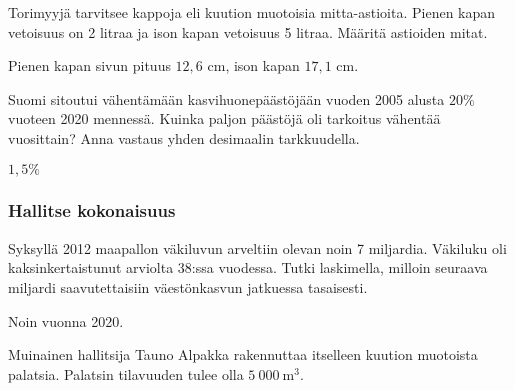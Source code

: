 \begin{tehtavasivu}
\begin{tehtava}%
Torimyyjä tarvitsee kappoja eli kuution muotoisia mitta-astioita. Pienen kapan vetoisuus on 2 litraa ja ison kapan vetoisuus 5 litraa. Määritä astioiden mitat.
\begin{vastaus}
Pienen kapan sivun pituus $12,6$ cm, ison kapan $17,1$ cm. 
\end{vastaus}
\end{tehtava}

\begin{tehtava}%
Suomi sitoutui vähentämään kasvihuonepäästöjään vuoden 2005 alusta $20\%$ vuoteen 2020 mennessä. Kuinka paljon päästöjä oli tarkoitus vähentää vuosittain? Anna vastaus yhden desimaalin tarkkuudella.
\begin{vastaus}
$1,5\%$
\end{vastaus}
\end{tehtava}

\subsubsection*{Hallitse kokonaisuus}
\begin{tehtava}%
Syksyllä 2012 maapallon väkiluvun arveltiin olevan noin 7 miljardia. Väkiluku oli kaksinkertaistunut arviolta 38:ssa vuodessa. Tutki laskimella, milloin seuraava miljardi saavutettaisiin väestönkasvun jatkuessa tasaisesti.
\begin{vastaus}
Noin vuonna 2020.
\end{vastaus}
\end{tehtava}

\begin{tehtava}
Muinainen hallitsija Tauno Alpakka rakennuttaa itselleen kuution muotoista palatsia.  Palatsin tilavuuden tulee olla $5~000~\mathrm{m}^3$. 
\begin{alakohdat}
\end{alakohdat}
\begin{vastaus}
\begin{alakohdat}
\end{alakohdat}
\end{vastaus}
\end{tehtava}


\end{tehtavasivu}
